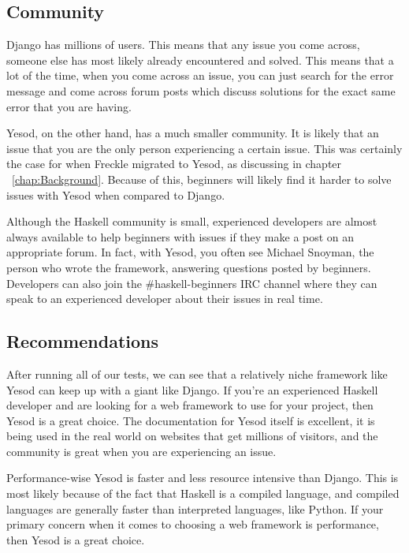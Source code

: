\subsection{Community}

Django has millions of users. This means that any issue you come across,
someone else has most likely already encountered and solved. This means that
a lot of the time, when you come across an issue, you can just search for
the error message and come across forum posts which discuss solutions
for the exact same error that you are having.

Yesod, on the other hand, has a much smaller community. It is likely that
an issue that you are the only person experiencing a certain issue. This
was certainly the case for when Freckle migrated to Yesod, as discussing in
chapter ~\ref{chap:Background}. Because of this, beginners will likely find it
harder to solve issues with Yesod when compared to Django.

Although the Haskell community is small, experienced developers are almost always
available to help beginners with issues if they make a post on an appropriate
forum. In fact, with Yesod, you often see Michael Snoyman, the person who wrote
the framework, answering questions posted by beginners. Developers can also
join the \#haskell-beginners IRC channel where they can speak to an experienced
developer about their issues in real time.

\subsection{Recommendations}

After running all of our tests, we can see that a relatively niche framework
like Yesod can keep up with a giant like Django. If you're an experienced
Haskell developer and are looking for a web framework to use for your project,
then Yesod is a great choice. The documentation for Yesod itself is excellent,
it is being used in the real world on websites that get millions of visitors,
and the community is great when you are experiencing an issue.

Performance-wise Yesod is faster and less resource intensive than Django. This
is most likely because of the fact that Haskell is a compiled language, and
compiled languages are generally faster than interpreted languages, like Python.
If your primary concern when it comes to choosing a web framework is performance,
then Yesod is a great choice.

